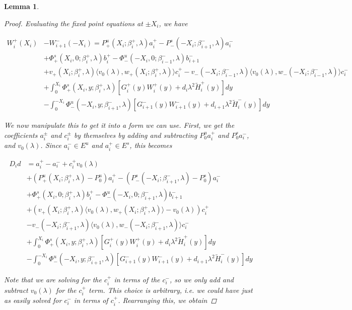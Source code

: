 \documentclass[12pt]{article}
\newtheorem{lemma}{Lemma}
\begin{document}
\begin{lemma}
\begin{proof}

Evaluating the fixed point equations at $\pm X_i$, we have

\begin{align*}
W_i^+(X_i) &- W_{i+1}^-(-X_i) = P^u_+(X_i; \beta_i^+, \lambda) a_i^+ - P^s_-(-X_i; \beta_{i+1}^-, \lambda) a_i^- \\
&+ \Phi^s_+(X_i, 0; \beta_i^+, \lambda)b_i^+ - \Phi^u_-(-X_i, 0; \beta_{i-1}^-, \lambda)b_{i+1}^- \\
&+ v_+(X_i; \beta_i^+, \lambda) \langle v_0(\lambda), w_+(X_i; \beta_i^+, \lambda) \rangle c_i^+ - v_-(-X_i; \beta_{i-1}^-, \lambda) \langle v_0(\lambda), w_-(-X_i; \beta_{i-1}^-, \lambda) \rangle c_i^- \\
&+ \int_0^{X_i} \Phi^s_+(X_i, y; \beta_i^+, \lambda) [ G_i^+(y) W_i^+(y) + d_i \lambda^2 \tilde{H}_i^+(y) ] dy \\
&- \int_0^{-X_i} \Phi^u_-(-X_i, y; \beta_{i+1}^-, \lambda) [ G_{i+1}^-(y) W_{i+1}^-(y) + d_{i+1} \lambda^2 \tilde{H}_i^-(y) ] dy
\end{align*}

We now manipulate this to get it into a form we can use. First, we get the coefficients $a_i^\pm$ and $c_i^\pm$ by themselves by adding and subtracting $P_0^u a_i^+$ and $P_0^s a_i^-$, and $v_0(\lambda)$. Since $a_i^- \in E^u$ and $a_i^+ \in E^s$, this becomes

\begin{align*}
D_i d &= a_i^+ - a_i^- + c_i^+ v_0(\lambda) \\
&+ (P^u_+(X_i; \beta_i^+, \lambda) - P_0^u)a_i^+ - (P^s_-(-X_i; \beta_{i+1}^-, \lambda) - P_0^s)a_i^- \\
&+ \Phi^s_+(X_i, 0; \beta_i^+, \lambda)b_i^+ - \Phi^u_-(-X_i, 0; \beta_{i+1}^-, \lambda)b_{i+1}^- \\
&+ (v_+(X_i; \beta_i^+, \lambda) \langle v_0(\lambda), w_+(X_i; \beta_i^+, \lambda) \rangle - v_0(\lambda) ) c_i^+ \\
&- v_-(-X_i; \beta_{i+1}^-, \lambda) \langle v_0(\lambda), w_-(-X_i; \beta_{i+1}^-, \lambda) \rangle c_i^- \\
&+ \int_0^{X_i} \Phi^s_+(X_i, y; \beta_i^+, \lambda) [ G_i^+(y) W_i^+(y) + d_i \lambda^2 \tilde{H}_i^+(y) ] dy \\
&- \int_0^{-X_i} \Phi^u_-(-X_i, y; \beta_{i+1}^-, \lambda) [ G_{i+1}^-(y) W_{i+1}^-(y) + d_{i+1} \lambda^2 \tilde{H}_i^-(y) ] dy
\end{align*}

Note that we are solving for the $c_i^+$ in terms of the $c_i^-$, so we only add and subtract $v_0(\lambda)$ for the $c_i^+$ term. This choice is arbitrary, i.e. we could have just as easily solved for $c_i^-$ in terms of $c_i^+$. Rearranging this, we obtain


\end{proof}
\end{lemma}
\end{document}
